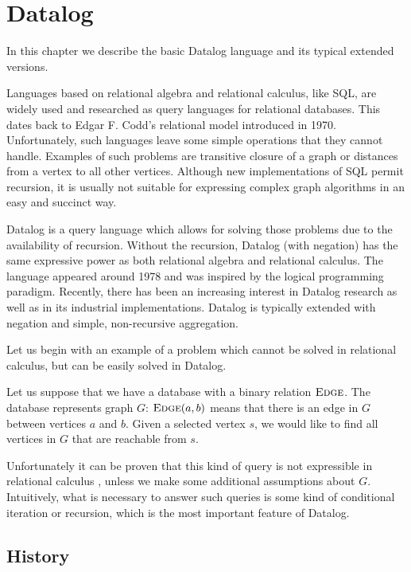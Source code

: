 
\chapter{Datalog}\label{r:datalog}

In this chapter we describe the basic Datalog language and its typical extended versions.

Languages based on relational algebra and relational calculus, like SQL, are widely used and researched as query languages for relational databases. This dates back to Edgar F. Codd's relational model \cite{coddrelmodel} introduced in 1970. Unfortunately, such languages leave some simple operations that they cannot handle. Examples of such problems are transitive closure of a graph or distances from a vertex to all other vertices. Although new implementations of SQL permit recursion, it is usually not suitable for expressing complex graph algorithms in an easy and succinct way.

Datalog \cite{fod} is a query language which allows for solving those problems due to the availability of recursion. Without the recursion, Datalog (with negation) has the same expressive power as both relational algebra and relational calculus. The language appeared around 1978 and was inspired by the logical programming paradigm. Recently, there has been an increasing interest in Datalog research as well as in its industrial implementations. Datalog is typically extended with negation and simple, non-recursive aggregation.

Let us begin with an example of a problem which cannot be solved in relational calculus, but can be easily solved in Datalog.

Let us suppose that we have a database with a binary relation $\textsc{Edge}$. The database represents graph $G$:	 $\textsc{Edge}(a, b)$ means that there is an edge in $G$ between vertices $a$ and $b$. Given a selected vertex $s$, we would like to find all vertices in $G$ that are reachable from $s$.

Unfortunately it can be proven that this kind of query is not expressible in relational calculus \cite{fod}, unless we make some additional assumptions about $G$. Intuitively, what is necessary to answer such queries is some kind of conditional iteration or recursion, which is the most important feature of Datalog.

\section{History}

